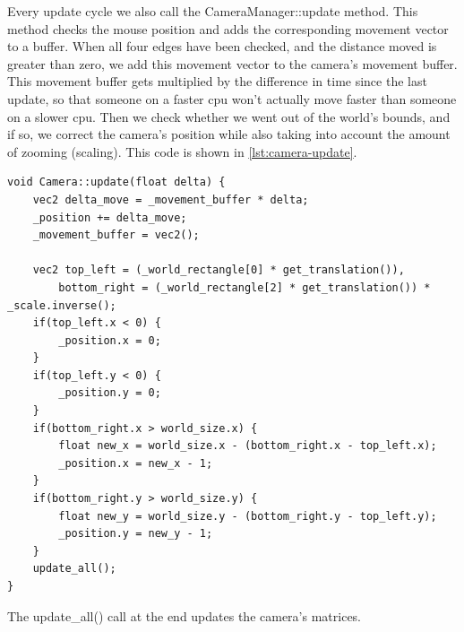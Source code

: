 Every update cycle we also call the CameraManager::update method. This method 
checks the mouse position and adds the corresponding movement vector to a 
buffer. When all four edges have been checked, and the distance moved is 
greater than zero, we add this movement vector to the camera's movement 
buffer. This movement buffer gets multiplied by the difference in time since 
the last update, so that someone on a faster cpu won't actually move faster 
than someone on a slower cpu. Then we check whether we went out of the world's 
bounds, and if so, we correct the camera's position while also taking into 
account the amount of zooming (scaling). This code is shown in 
\cref{lst:camera-update}.

\begin{lstlisting}[caption={Camera update method.},label={lst:camera-update}]
void Camera::update(float delta) {
    vec2 delta_move = _movement_buffer * delta;
    _position += delta_move;
    _movement_buffer = vec2();

    vec2 top_left = (_world_rectangle[0] * get_translation()),
        bottom_right = (_world_rectangle[2] * get_translation()) * _scale.inverse();
    if(top_left.x < 0) {
        _position.x = 0;
    }
    if(top_left.y < 0) {
        _position.y = 0;
    }
    if(bottom_right.x > world_size.x) {
        float new_x = world_size.x - (bottom_right.x - top_left.x);
        _position.x = new_x - 1;
    }
    if(bottom_right.y > world_size.y) {
        float new_y = world_size.y - (bottom_right.y - top_left.y);
        _position.y = new_y - 1;
    }
    update_all();
}
\end{lstlisting}

The update\_all() call at the end updates the camera's matrices.

